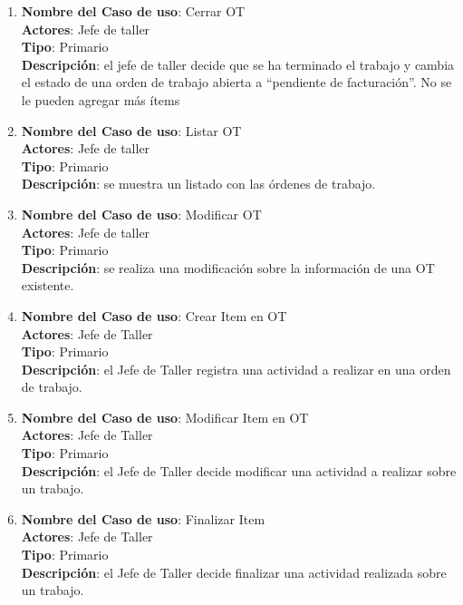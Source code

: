 \documentclass[12pt]{extarticle}
\begin{document}
\begin{spacing}{1.2}
\begin{enumerate}
            \item 	\textbf{Nombre del Caso de uso}: Cerrar OT\\
                    \textbf{Actores}: Jefe de taller\\
                    \textbf{Tipo}: Primario\\
                    \textbf{Descripción}: el jefe de taller decide que se ha terminado el trabajo y cambia el estado de una orden de trabajo abierta a ``pendiente de facturación''. No se le pueden agregar más ítems

            \item 	\textbf{Nombre del Caso de uso}: Listar OT\\
                    \textbf{Actores}: Jefe de taller\\
                    \textbf{Tipo}: Primario\\
                    \textbf{Descripción}: se muestra un listado con las órdenes de trabajo.

            \item 	\textbf{Nombre del Caso de uso}: Modificar OT\\
                    \textbf{Actores}: Jefe de taller\\
                    \textbf{Tipo}: Primario\\
                    \textbf{Descripción}: se realiza una modificación sobre la información de una OT existente.

            \item 	\textbf{Nombre del Caso de uso}: Crear Item en OT\\
                    \textbf{Actores}: Jefe de Taller\\
                    \textbf{Tipo}: Primario\\
                    \textbf{Descripción}: el Jefe de Taller registra una actividad a realizar en una orden de trabajo.

            \item 	\textbf{Nombre del Caso de uso}: Modificar Item en OT\\
                    \textbf{Actores}: Jefe de Taller\\
                    \textbf{Tipo}: Primario\\
                    \textbf{Descripción}: el Jefe de Taller decide modificar una actividad a realizar sobre un trabajo.
            
            \item 	\textbf{Nombre del Caso de uso}: Finalizar Item\\
                    \textbf{Actores}: Jefe de Taller\\
                    \textbf{Tipo}: Primario\\
                    \textbf{Descripción}: el Jefe de Taller decide finalizar una actividad realizada sobre un trabajo.


\end{enumerate}
\end{spacing}
\end{document}
